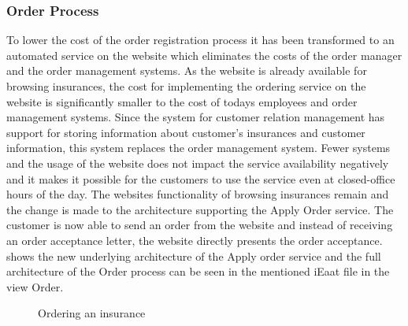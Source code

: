 \subsubsection{Order Process}
To lower the cost of the order registration process it has been transformed to an automated service on the website which eliminates the costs of the order manager and the order management systems. As the website is already available for browsing insurances, the cost for implementing the ordering service on the website is significantly smaller to the cost of todays employees and order management systems. Since the system for customer relation management has support for storing information about customer's insurances and customer information, this system replaces the order management system. Fewer systems and the usage of the website does not impact the service availability negatively and it makes it possible for the customers to use the service even at closed-office hours of the day. The websites functionality of browsing insurances remain and the change is made to the architecture supporting the Apply Order service. The customer is now able to send an order from the website and instead of receiving an order acceptance letter, the website directly presents the order acceptance.  shows the new underlying architecture of the Apply order service and the full architecture of the Order process can be seen in the mentioned iEaat file in the view Order.
\begin{center}
	\begin{figure}[H]
		\centering
		\setlength\fboxsep{7pt}
		\setlength\fboxrule{0.5pt}
		\caption{Ordering an insurance}
		\label{fig:map_order_tobe}
	\end{figure}
\end{center}

